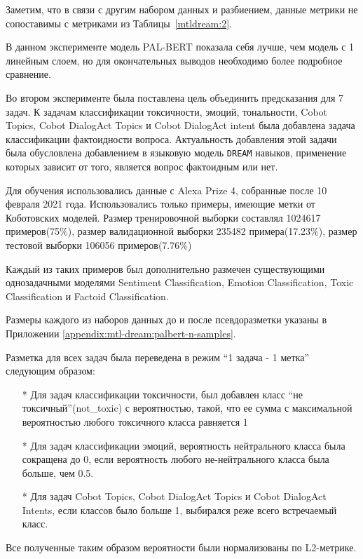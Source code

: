 Заметим, что в связи с другим набором данных и разбиением, данные метрики не сопоставимы с метриками из Таблицы~\ref{mtldream:2}.
 
В данном эксперименте модель PAL-BERT показала себя лучше, чем модель с 1 линейным слоем, но для окончательных выводов необходимо более подробное сравнение.

Во втором эксперименте была поставлена цель объединить предсказания для 7 задач. К задачам классификации токсичности, эмоций, тональности, Cobot Topics, Cobot DialogAct Topics и Cobot DialogAct intent была добавлена задача классификации фактоидности вопроса. Актуальность добавления этой задачи была обусловлена добавлением в языковую модель \texttt{DREAM} навыков, применение которых зависит от того, является вопрос фактоидным или нет.

Для обучения использовались данные с Alexa Prize 4, собранные после 10 февраля 2021 года. Использовались только примеры, имеющие метки от Коботовских моделей. Размер тренировочной выборки составлял 1024617 примеров(75\%), размер валидационной выборки 235482 примера(17.23\%), размер тестовой выборки 106056 примеров(7.76\%)

Каждый из таких примеров был дополнительно размечен существующими однозадачными моделями Sentiment Classification, Emotion Classification, Toxic Classification и Factoid Classification.

Размеры каждого из наборов данных до и после псевдоразметки указаны в Приложении \ref{appendix:mtl-dream:palbert-n-samples}. 

Разметка для всех задач была переведена в режим “1 задача - 1 метка” следующим образом:
\begin{itemize}
\item[*] Для задач классификации токсичности, был добавлен класс “не токсичный”({not\_toxic}) с вероятностью, такой, что ее сумма с максимальной вероятностью любого токсичного класса равняется 1
\item[*] Для задач классификации эмоций, вероятность нейтрального класса была сокращена до 0, если вероятность любого не-нейтрального класса была больше, чем 0.5.
\item[*] Для задач Cobot Topics, Cobot DialogAct Topics и Cobot DialogAct Intents, если классов было больше 1, выбирался реже всего встречаемый класс.
\end{itemize}
Все полученные таким образом вероятности были нормализованы по L2-метрике.

